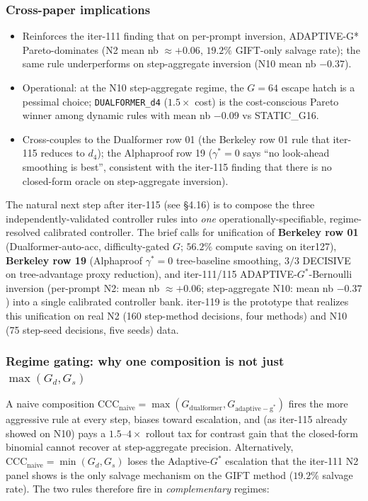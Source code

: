 \documentclass{article}
\begin{document}
\subsubsection*{Cross-paper implications}
\begin{itemize}
\item Reinforces the iter-111 finding that on per-prompt inversion,
  ADAPTIVE-G* Pareto-dominates (N2 mean nb $\approx+0.06$,
  $19.2\%$ GIFT-only salvage rate); the same rule underperforms on
  step-aggregate inversion (N10 mean nb $-0.37$).
\item Operational: at the N10 step-aggregate regime, the $G=64$
  escape hatch is a pessimal choice; \texttt{DUALFORMER\_d4}
  ($1.5\times$ cost) is the cost-conscious Pareto winner among
  dynamic rules with mean nb $-0.09$ vs STATIC\_G16.
\item Cross-couples to the Dualformer row 01 (the Berkeley row 01
  rule that iter-115 reduces to $d_4$); the Alphaproof row 19
  ($\gamma^*=0$ says ``no look-ahead smoothing is best'', consistent
  with the iter-115 finding that there is no closed-form oracle on
  step-aggregate inversion).
\end{itemize}
 \label{sec:p7-calibrated-controller-unification}

The natural next step after iter-115 (see §4.16) is to compose the
three independently-validated controller rules into \emph{one}
operationally-specifiable, regime-resolved calibrated controller.
The brief calls for unification of \textbf{Berkeley row 01}
(Dualformer-auto-acc, difficulty-gated $G$; $56.2\%$ compute saving
on iter127), \textbf{Berkeley row 19} (Alphaproof $\gamma^*=0$
tree-baseline smoothing, $3/3$ DECISIVE on tree-advantage proxy
reduction), and iter-111/115 ADAPTIVE-$G^*$-Bernoulli inversion
(per-prompt N2: mean nb $\approx+0.06$; step-aggregate N10: mean nb
$-0.37$) into a single calibrated controller bank. iter-119 is the
prototype that realizes this unification on real N2 (160 step-method
decisions, four methods) and N10 (75 step-seed decisions, five seeds)
data.

\subsubsection*{Regime gating: why one composition is not just $\max(G_d,G_s)$}

A naive composition $\mathrm{CCC}_{\mathrm{naive}}=\max(G_{\mathrm{dualformer}},
G_{\mathrm{adaptive-g^*}})$ fires the more aggressive rule at every
step, biases toward escalation, and (as iter-115 already showed on
N10) pays a $1.5$--$4\times$ rollout tax for contrast gain that the
closed-form binomial cannot recover at step-aggregate precision.
Alternatively, $\mathrm{CCC}_{\mathrm{naive}}=\min(G_d,G_s)$ loses the
Adaptive-$G^*$ escalation that the iter-111 N2 panel shows is the only
salvage mechanism on the GIFT method ($19.2\%$ salvage rate). The
two rules therefore fire in \emph{complementary} regimes:
\end{document}
